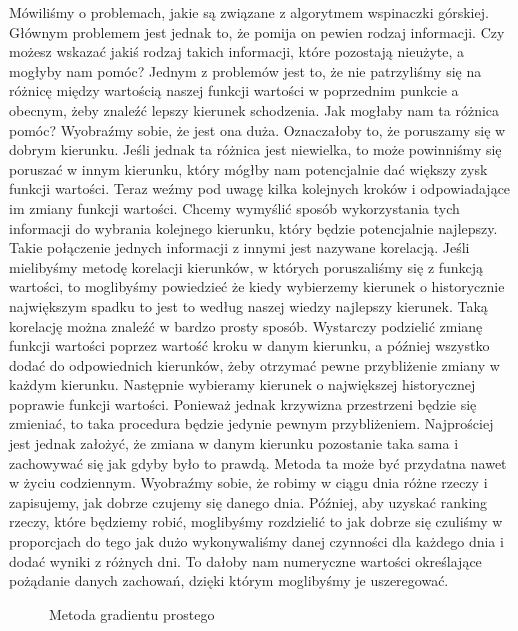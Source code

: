 Mówiliśmy o problemach, jakie są związane z algorytmem wspinaczki górskiej. Głównym problemem jest jednak to, że pomija on pewien rodzaj informacji. Czy możesz wskazać jakiś rodzaj takich informacji, które pozostają nieużyte, a mogłyby nam pomóc? Jednym z problemów jest to, że nie patrzyliśmy się na różnicę między wartością naszej funkcji wartości w poprzednim punkcie a obecnym, żeby znaleźć lepszy kierunek schodzenia. Jak mogłaby nam ta różnica pomóc? Wyobraźmy sobie, że jest ona duża. Oznaczałoby to, że poruszamy się w dobrym kierunku. Jeśli jednak ta różnica jest niewielka, to może powinniśmy się poruszać w innym kierunku, który mógłby nam potencjalnie dać większy zysk funkcji wartości. Teraz weźmy pod uwagę kilka kolejnych kroków i odpowiadające im zmiany funkcji wartości. Chcemy wymyślić sposób wykorzystania tych informacji do wybrania kolejnego kierunku, który będzie potencjalnie najlepszy. Takie połączenie jednych informacji z innymi jest nazywane korelacją. Jeśli mielibyśmy metodę korelacji kierunków, w których poruszaliśmy się z funkcją wartości, to moglibyśmy powiedzieć że kiedy wybierzemy kierunek o historycznie największym spadku to jest to według naszej wiedzy najlepszy kierunek. Taką korelację można znaleźć w bardzo prosty sposób. Wystarczy podzielić zmianę funkcji wartości poprzez wartość kroku w danym kierunku, a później wszystko dodać do odpowiednich kierunków, żeby otrzymać pewne przybliżenie zmiany w każdym kierunku. Następnie wybieramy kierunek o największej historycznej poprawie funkcji wartości. Ponieważ jednak krzywizna przestrzeni będzie się zmieniać, to taka procedura będzie jedynie pewnym przybliżeniem. Najprościej jest jednak założyć, że zmiana w danym kierunku pozostanie taka sama i zachowywać się jak gdyby było to prawdą. Metoda ta może być przydatna nawet w życiu codziennym. Wyobraźmy sobie, że robimy w ciągu dnia różne rzeczy i zapisujemy, jak dobrze czujemy się danego dnia. Później, aby uzyskać ranking rzeczy, które będziemy robić, moglibyśmy rozdzielić to jak dobrze się czuliśmy w proporcjach do tego jak dużo wykonywaliśmy danej czynności dla każdego dnia i dodać wyniki z różnych dni. To dałoby nam numeryczne wartości określające pożądanie danych zachowań, dzięki którym moglibyśmy je uszeregować.\newline

\newpage
\begin{figure}[h]

\caption{Metoda gradientu prostego}
\centering
\end{figure}
\newpage

